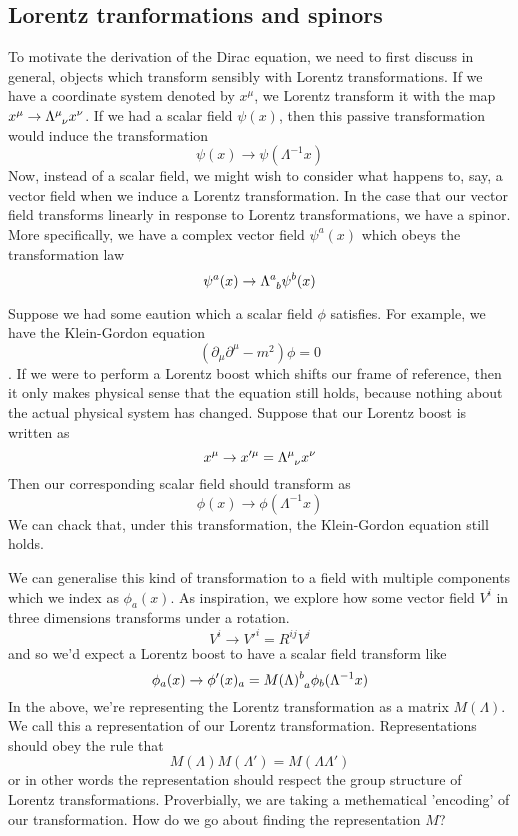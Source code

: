 \subsection{Lorentz tranformations and spinors}  
To motivate the derivation of the Dirac equation, we need to first discuss in general, objects which transform sensibly with Lorentz transformations. If we have a coordinate system denoted by $x^\mu$, we Lorentz transform it with the map $x^\mu \rightarrow \Lambda\indices{^\mu_\nu} x^\nu$. If we had a scalar field $\psi(x)$, then this passive transformation would induce the transformation \[ 
\psi(x) \rightarrow \psi(\Lambda^{ -1} x) \] 
Now, instead of a scalar field, we might wish to consider what happens to, say, a vector field when we induce a Lorentz transformation. In the case that our vector field transforms linearly in response to Lorentz transformations, we have a spinor. More specifically, we have a complex vector field $\psi^a (x) $ which obeys the transformation law 
\[ \psi^a (x) \rightarrow \Lambda\indices{^a_b}\psi^b(x ) \] 


Suppose we had some eaution which a scalar field $\phi$ satisfies. For example, we have the Klein-Gordon equation 
\[ \left( \partial_\mu\partial^\mu - m^2 \right) \phi = 0 \]. If we were to perform a Lorentz boost which shifts our frame of reference, then it only makes physical sense that the equation still holds, because nothing about the actual physical system has changed. Suppose that our Lorentz boost is written as 
\[ x^\mu \rightarrow x'^\mu  = \Lambda\indices{^\mu_\nu}x^\nu \]
Then our corresponding scalar field should transform as 
\[ \phi(x) \rightarrow \phi(\Lambda^{-1} x) \] 
We can chack that, under this transformation, the Klein-Gordon equation still holds. 


We can generalise this kind of transformation to a field with multiple components which we index as $\phi_a(x) $. As inspiration, we explore how some vector field $V^i$ in three dimensions transforms under a rotation.
\[ 
V^i \rightarrow V'^i  = R^{ij}V^j 
\]
and so we'd expect a Lorentz boost to have a scalar field transform like 
\[
\phi_a(x) \rightarrow \phi'(x)_a = M(\Lambda)\indices{^b_a}\phi_b(\Lambda^{-1}x)
\] 
In the above, we're representing the Lorentz transformation as a matrix $M(\Lambda)$. We call this a representation of our Lorentz transformation. Representations should obey the rule that 
\[ M(\Lambda)M(\Lambda') = M(\Lambda \Lambda')\] or in other words the representation should respect the group structure of Lorentz transformations. Proverbially, we are taking a methematical 'encoding' of our transformation. How do we go about finding the representation $M$? 

